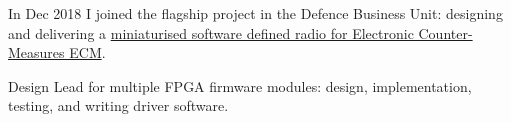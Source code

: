 
In Dec 2018 I joined the flagship project in the Defence Business Unit: designing and delivering a
\href{https://roke.co.uk/innovations/protecting-personnel-from-ieds}{miniaturised software defined radio for Electronic Counter-Measures ECM}.
\vspace{0.25em}
\begin{tightemize}
  \item Design Lead for multiple FPGA firmware modules: design, implementation, testing, and writing driver software.
\end{tightemize}
\sectionsep{}
\vfill{}
